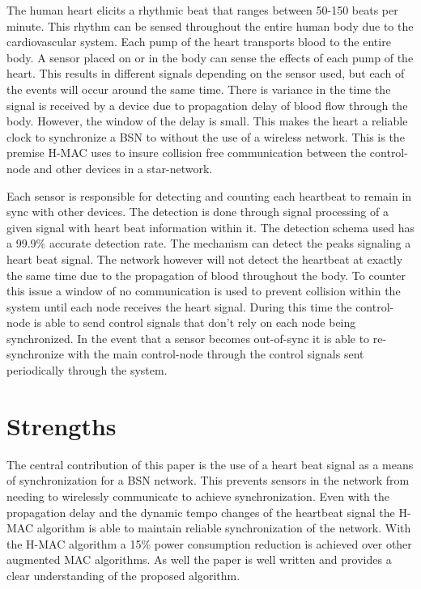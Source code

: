 \documentclass{article}
\begin{document}
The human heart elicits a rhythmic beat that ranges between 50-150 beats per minute. This rhythm can be sensed throughout the entire human body due to the cardiovascular system. Each pump of the heart transports blood to the entire body. A sensor placed on or in the body can sense the effects of each pump of the heart. This results in different signals depending on the sensor used, but each of the events will occur around the same time. There is variance in the time the signal is received by a device due to propagation delay of blood flow through the body. However, the window of the delay is small. This makes the heart a reliable clock to synchronize a BSN to without the use of a wireless network. This is the premise H-MAC uses to insure collision free communication between the control-node and other devices in a star-network.

Each sensor is responsible for detecting and counting each heartbeat to remain in sync with other devices. The detection is done through signal processing of a given signal with heart beat information within it. The detection schema used has a 99.9\% accurate detection rate. The mechanism can detect the peaks signaling a heart beat signal. The network however will not detect the heartbeat at exactly the same time due to the propagation of blood throughout the body. To counter this issue a window of no communication is used to prevent collision within the system until each node receives the heart signal. During this time the control-node is able to send control signals that don't rely on each node being synchronized. In the event that a sensor becomes out-of-sync it is able to re-synchronize with the main control-node through the control signals sent periodically through the system.

\section*{Strengths}
The central contribution of this paper is the use of a heart beat signal as a means of synchronization for a BSN network. This prevents sensors in the network from needing to wirelessly communicate to achieve synchronization. Even with the propagation delay and the dynamic tempo changes of the heartbeat signal the H-MAC algorithm is able to maintain reliable synchronization of the network. With the H-MAC algorithm a 15\% power consumption reduction is achieved over other augmented MAC algorithms. As well the paper is well written and provides a clear understanding of the proposed algorithm.
\end{document}
